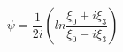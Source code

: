 \begin{equation}
\psi = \frac{1}{2i} (ln \frac{\xi_{0} + i \xi_{3}}{\xi_{0} -i \xi_{3}})
\end{equation}


